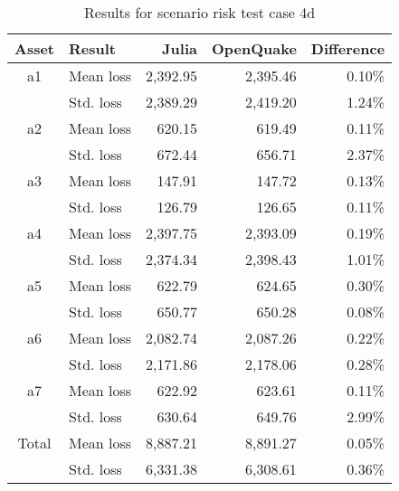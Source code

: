 \begin{table}[htbp]

\centering
\begin{tabular}{ c l r r r }

\hline
\rowcolor{anti-flashwhite}
\bf{Asset} & \bf{Result} & \bf{Julia} & \bf{OpenQuake} & \bf{Difference}\\
\hline
a1 & Mean loss & 2,392.95 & 2,395.46 & 0.10\% \\
 & Std. loss & 2,389.29 & 2,419.20 & 1.24\% \\
\hline
a2 & Mean loss & 620.15 & 619.49 & 0.11\% \\
 & Std. loss & 672.44 & 656.71 & 2.37\% \\
\hline
a3 & Mean loss & 147.91 & 147.72 & 0.13\% \\
 & Std. loss & 126.79 & 126.65 & 0.11\% \\
\hline
a4 & Mean loss & 2,397.75 & 2,393.09 & 0.19\% \\
 & Std. loss & 2,374.34 & 2,398.43 & 1.01\% \\
\hline
a5 & Mean loss & 622.79 & 624.65 & 0.30\% \\
 & Std. loss & 650.77 & 650.28 & 0.08\% \\
\hline
a6 & Mean loss & 2,082.74 & 2,087.26 & 0.22\% \\
 & Std. loss & 2,171.86 & 2,178.06 & 0.28\% \\
\hline
a7 & Mean loss & 622.92 & 623.61 & 0.11\% \\
 & Std. loss & 630.64 & 649.76 & 2.99\% \\
\hline
Total & Mean loss & 8,887.21 & 8,891.27 & 0.05\% \\
 & Std. loss & 6,331.38 & 6,308.61 & 0.36\% \\
\hline
\end{tabular}

\caption{Results for scenario risk test case 4d}
\label{tab:result-sr-4d}
\end{table}
